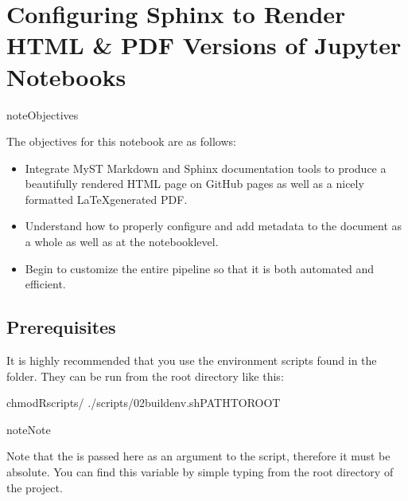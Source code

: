 \documentclass[letterpaper,12pt,english]{sphinxmanual}
\begin{document}
\chapter{Configuring Sphinx to Render HTML \& PDF Versions of Jupyter Notebooks}
\label{\detokenize{notebooks/03-sphinx-config:configuring-sphinx-to-render-html-pdf-versions-of-jupyter-notebooks}}\label{\detokenize{notebooks/03-sphinx-config::doc}}
\begin{sphinxadmonition}{note}{Objectives}

\sphinxAtStartPar
The objectives for this notebook are as follows:
\begin{itemize}
\item {} 
\sphinxAtStartPar
Integrate MyST Markdown and Sphinx documentation tools to produce a beautifully rendered HTML page on GitHub pages as well as a nicely formatted LaTeX\sphinxhyphen{}generated PDF.

\item {} 
\sphinxAtStartPar
Understand how to properly configure and add metadata to the document as a whole as well as at the notebook\sphinxhyphen{}level.

\item {} 
\sphinxAtStartPar
Begin to customize the entire pipeline so that it is both automated and efficient.

\end{itemize}
\end{sphinxadmonition}


\section{Prerequisites}
\label{\detokenize{notebooks/03-sphinx-config:prerequisites}}
\sphinxAtStartPar
It is highly recommended that you use the  environment scripts found in the  folder. They can be run from the root directory like this:

\begin{sphinxVerbatim}[commandchars=\\\{\}]
chmod\PYGZhy{}Rscripts/
./scripts/02\PYGZhy{}build\PYGZhy{}env.sh\PYGZlt{}PATH\PYGZus{}TO\PYGZus{}ROOT\PYGZgt{}
\end{sphinxVerbatim}

\begin{sphinxadmonition}{note}{Note}

\sphinxAtStartPar
Note that the  is passed here as an argument to the script, therefore it must be absolute. You can find this variable by simple typing  from the root directory of the project.
\end{sphinxadmonition}
\end{document}
